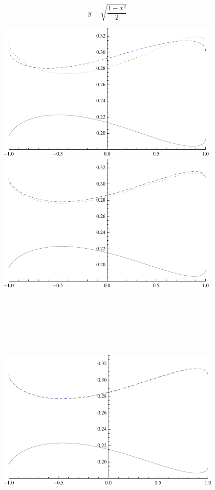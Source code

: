 \documentclass[a0,portrait]{a0poster}
\begin{document}
\begin{center}
{\begin{equation}
y=\sqrt{\frac{1-x^2}{2}}
\end{equation}

\begin{figure}
\includegraphics[height=70mm]{xyy-100-steps-1-1.pdf}
\includegraphics[height=70mm]{xyy-500-steps-1-1.pdf}
\includegraphics[height=140mm]{xyy-2000-steps-1-1.pdf}

\end{figure}}
\end{center}
\end{document}
